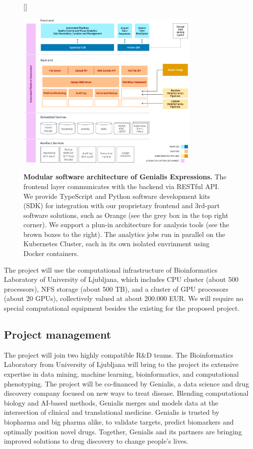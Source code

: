 \documentclass[11pt,a4paper]{article}
\renewcommand{\bold}{\textbf}
\begin{document}
\begin{figure}[htbp]
[\FBwidth]
{\caption{\small\bold{Modular software architecture of Genialis Expressions.} The frontend layer communicates with the backend via RESTful API. We provide TypeScript and Python software development kits (SDK) for integration with our proprietary frontend and 3rd-part software solutions, such as Orange (see the grey box in the top right corner). We support a plun-in architecture for analysis tools (see the brown boxes to the right). The analytics jobs run in parallel on the Kubernetes Cluster, each in its own isolated envrinment using Docker containers.}
\label{fig:genialis-expressions-software-components}}
{\includegraphics[width=0.8\textwidth]{genialis-expressions-software-components}}
\end{figure}

The project will use the computational infrastructure of Bioinformatics Laboratory of University of Ljubljana, which includes CPU cluster (about 500 processors), NFS storage (about 500 TB), and a cluster of GPU processors (about 20 GPUs), collectively valued at about 200.000 EUR. We will require no special computational equipment besides the existing for the proposed project.

\subsection{Project management}

The project will join two highly compatible R\&D teams. The Bioinformatics Laboratory from University of Ljubljana will bring to the project its extensive expertise in data mining, machine learning, bioinformatics, and computational phenotyping. The project will be co-financed by Genialis, a data science and drug discovery company focused on new ways to treat disease. Blending computational biology and AI-based methods, Genialis merges and models data at the intersection of clinical and translational medicine. Genialis is trusted by biopharma and big pharma alike, to validate targets, predict biomarkers and optimally position novel drugs. Together, Genialis and its partners are bringing improved solutions to drug discovery to change people's lives.
\end{document}
